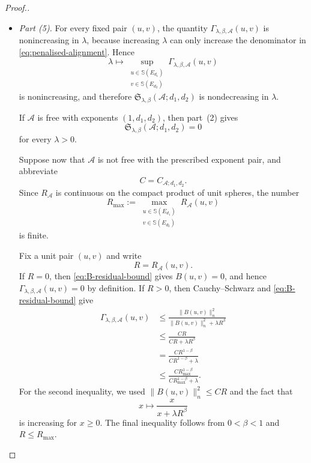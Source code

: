 \documentclass[pdflatex,sn-mathphys-num]{sn-jnl}%
\theoremstyle{remark}
\theoremstyle{definition}
\begin{document}
\begin{proof}[Proof.]
\begin{itemize}
\item \emph{Part (5).}
For every fixed pair $(u,v)$, the quantity
$\Gamma_{\lambda,\beta,\mathcal{A}}(u,v)$ is nonincreasing in $\lambda$,
because increasing $\lambda$ can only increase the denominator in
\eqref{eq:penalised-alignment}. Hence
\[
\lambda
\longmapsto
\sup_{\substack{u\in\mathbb S(E_{d_1})\\
v\in\mathbb S(E_{d_2})}}
\Gamma_{\lambda,\beta,\mathcal{A}}(u,v)
\]
is nonincreasing, and therefore
$\mathfrak S_{\lambda,\beta}(\mathcal{A};d_1,d_2)$ is nondecreasing in
$\lambda$.

If $\mathcal{A}$ is free with exponents $(1,d_1,d_2)$, then part~(2) gives
\[
\mathfrak S_{\lambda,\beta}(\mathcal{A};d_1,d_2)=0
\]
for every $\lambda>0$.

Suppose now that $\mathcal{A}$ is not free with the prescribed exponent pair,
and abbreviate
\[
C=C_{\mathcal{A};d_1,d_2}.
\]
Since $R_{\mathcal{A}}$ is continuous on the compact product of unit spheres,
the number
\[
R_{\max}
:=
\max_{\substack{u\in\mathbb S(E_{d_1})\\
v\in\mathbb S(E_{d_2})}}
R_{\mathcal{A}}(u,v)
\]
is finite.

Fix a unit pair $(u,v)$ and write
\[
R=R_{\mathcal{A}}(u,v).
\]
If $R=0$, then \eqref{eq:B-residual-bound} gives $B(u,v)=0$, and hence
$\Gamma_{\lambda,\beta,\mathcal{A}}(u,v)=0$ by definition. If $R>0$, then
Cauchy--Schwarz and \eqref{eq:B-residual-bound} give
\begin{align*}
\Gamma_{\lambda,\beta,\mathcal{A}}(u,v)
&\leq
\frac{\|B(u,v)\|_n^2}
{\|B(u,v)\|_n^2+\lambda R^\beta}\\
&\leq
\frac{CR}{CR+\lambda R^\beta}\\
&=
\frac{CR^{1-\beta}}
{CR^{1-\beta}+\lambda}\\
&\leq
\frac{CR_{\max}^{1-\beta}}
{CR_{\max}^{1-\beta}+\lambda}.
\end{align*}
For the second inequality, we used
$\|B(u,v)\|_n^2\leq CR$ and the fact that
\[
x\longmapsto\frac{x}{x+\lambda R^\beta}
\]
is increasing for $x\geq0$. The final inequality follows from
$0<\beta<1$ and $R\leq R_{\max}$.


\end{itemize}
\end{proof}
\end{document}
